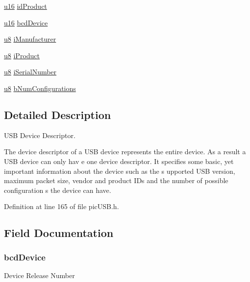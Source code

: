 \begin{DoxyCompactItemize}
\item 
\hyperlink{p8_2pinguino_2core_2typedef_8h_a50b0d1c7a54fa09a64a3ac111c778520}{u16} \hyperlink{struct_u_s_b___device___descriptor_a519c2f3b9ade6de6e761b4ada00d31b9}{id\-Product}
\item 
\hyperlink{p8_2pinguino_2core_2typedef_8h_a50b0d1c7a54fa09a64a3ac111c778520}{u16} \hyperlink{struct_u_s_b___device___descriptor_a75748d3657ef8f02b2562a71e1b1f197}{bcd\-Device}
\item 
\hyperlink{p8_2pinguino_2core_2typedef_8h_aed742c436da53c1080638ce6ef7d13de}{u8} \hyperlink{struct_u_s_b___device___descriptor_aae88465cfdcbe8c3654a5d317ca2a428}{i\-Manufacturer}
\item 
\hyperlink{p8_2pinguino_2core_2typedef_8h_aed742c436da53c1080638ce6ef7d13de}{u8} \hyperlink{struct_u_s_b___device___descriptor_a038aa24fddd7b42b20976e13392954f2}{i\-Product}
\item 
\hyperlink{p8_2pinguino_2core_2typedef_8h_aed742c436da53c1080638ce6ef7d13de}{u8} \hyperlink{struct_u_s_b___device___descriptor_ad5cf25949929f3baddc6f1b2751835dc}{i\-Serial\-Number}
\item 
\hyperlink{p8_2pinguino_2core_2typedef_8h_aed742c436da53c1080638ce6ef7d13de}{u8} \hyperlink{struct_u_s_b___device___descriptor_a26db168b352c51f781975b270ee76692}{b\-Num\-Configurations}
\end{DoxyCompactItemize}


\subsection{Detailed Description}
U\-S\-B Device Descriptor.\par
 The device descriptor of a U\-S\-B device represents the entire device. As a result a U\-S\-B device can only hav e one device descriptor. It specifies some basic, yet important information about the device such as the s upported U\-S\-B version, maximum packet size, vendor and product I\-Ds and the number of possible configuration s the device can have. 

Definition at line 165 of file pic\-U\-S\-B.\-h.



\subsection{Field Documentation}
\hypertarget{struct_u_s_b___device___descriptor_a75748d3657ef8f02b2562a71e1b1f197}{
\subsubsection[{bcd\-Device}]{ bcd\-Device}}\label{struct_u_s_b___device___descriptor_a75748d3657ef8f02b2562a71e1b1f197}
Device Release Number 

